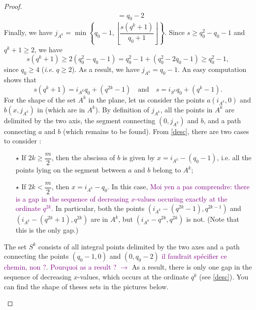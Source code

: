 \documentclass[a4paper]{article}
\newcommand\jade[1]{\textcolor{purple}{#1}}
\begin{document}
\begin{proof}
\begin{align*}
            &= q_0-2
\end{align*}
Finally, we have $j_{A^k} = \min \left\{ q_0-1, \left\lfloor \dfrac{s(q^k+1)}{q_0+1} \right\rfloor \right\}$. Since $s \geq q_0^2 - q_0 -1$ and $q^k+1 \geq 2$, we have
\begin{equation} \label{desc}
s(q^k+1) \geq 2(q_0^2-q_0-1) = q_0^2 - 1 + (q_0^2-2q_0-1) \geq q_0^2-1,
\end{equation}
since $q_0 \geq 4$ (\emph{i.e.} $q \geq 2$). As a result, we have $j_{A^k} = q_0-1$. 
An easy computation shows that 
\[s(q^k+1) = i_{A^k}q_0+(q^{2k}-1) \quad \mathrm{and} \quad s=i_{S^k}q_0 + (q^k-1).\]
For the shape of the set $A^k$ in the plane, let us consider the points $a(i_{A^k},0)$ and $b(x,j_{A^k})$ in  (which are in $A^k$). By definition of $j_{A^k}$, all the points in $A^k$ are delimited by the two axis, the segment connecting $(0,j_{A^k})$ and $b$, and a path connecting $a$ and $b$ (which remains to be found). From \eqref{desc}, there are two cases to consider :  
\begin{enumerate}
    \item[$\star$] If $2k \geq \dfrac{m}{2}$, then the abscissa of $b$ is given by $x=i_{A^k}-(q_0-1)$, i.e. all the points lying on the segment between $a$ and $b$ belong to $A^k$;
    \item[$\star$] If $2k < \dfrac{m}{2}$, then $x=i_{A^k}-q_0$. In this case, \jade{Moi yen a pas comprendre: there is a gap in the sequence of decreasing $x$-values occuring exactly at the ordinate $q^{2k}$.} In particular, both the points $(i_{A^k}-(q^{2k}-1),q^{2k-1})$ and $(i_{A^k}-(q^{2k}+1),q^{2k})$ are in $A^k$, but $(i_{A^k}-q^{2k},q^{2k})$ is not. (Note that this is the only gap.)
\end{enumerate}
The set $S^k$ consists of all integral points delimited by the two axes and a path connecting the points $(q_0-1,0)$ and $(0,q_0-2)$ \jade{il faudrait spécifier ce chemin, non ?}. \jade{Pourquoi as a result ? $\rightarrow$} As a result, there is only one gap in the sequence of decreasing $x$-values, which occurs at the ordinate $q^k$ (see \eqref{desc}). You can find the shape of theses sets in the pictures below.


\vspace*{0.3cm}
\begin{figure}[h]
\begin{center}
\end{center}
\end{figure}
\end{proof}
\end{document}

